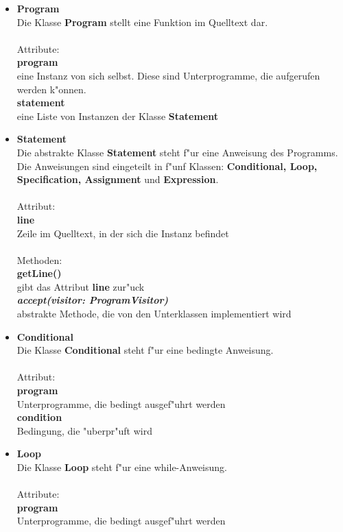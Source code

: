 \documentclass[10pt,a4paper,titlepage]{article}
\begin{document}
\begin{itemize}
\item \textbf{Program} \\
Die Klasse \textbf{Program} stellt eine Funktion im Quelltext dar. \\\\
Attribute: \\
\textbf{program} \\
eine Instanz von sich selbst. Diese sind Unterprogramme, die aufgerufen werden k"onnen.\\
\textbf{statement} \\
eine Liste von Instanzen der Klasse \textbf{Statement}
\item \textbf{Statement} \\
Die abstrakte Klasse \textbf{Statement} steht f"ur eine Anweisung des Programms. Die Anweisungen sind eingeteilt in f"unf Klassen: \textbf{Conditional, Loop, Specification, Assignment} und \textbf{Expression}. \\\\
Attribut:\\
\textbf{line} \\
Zeile im Quelltext, in der sich die Instanz befindet\\\\
Methoden: \\
\textbf{getLine()} \\
gibt das Attribut \textbf{line} zur"uck \\
\textbf{\textit{accept(visitor: ProgramVisitor)}}\\
abstrakte Methode, die von den Unterklassen implementiert wird 
\item \textbf{Conditional} \\
Die Klasse \textbf{Conditional} steht f"ur eine bedingte Anweisung. \\\\
Attribut: \\
\textbf{program} \\
Unterprogramme, die bedingt ausgef"uhrt werden \\
\textbf{condition} \\
Bedingung, die "uberpr"uft wird 
\item \textbf{Loop} \\
Die Klasse \textbf{Loop} steht f"ur eine while-Anweisung. \\\\
Attribute: \\
\textbf{program} \\
Unterprogramme, die bedingt ausgef"uhrt werden \\

\end{itemize}
\end{document}
